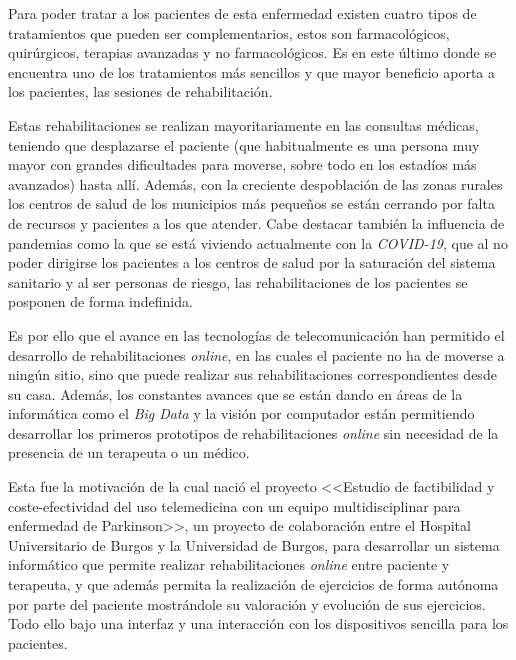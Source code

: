 Para poder tratar a los pacientes de esta enfermedad existen cuatro tipos de tratamientos que pueden ser complementarios, estos son farmacológicos, quirúrgicos, terapias avanzadas y no farmacológicos. Es en este último donde se encuentra uno de los tratamientos más sencillos y que mayor beneficio aporta a los pacientes, las sesiones de rehabilitación.

Estas rehabilitaciones se realizan mayoritariamente en las consultas médicas, teniendo que desplazarse el paciente (que habitualmente es una persona muy mayor con grandes dificultades para moverse, sobre todo en los estadíos más avanzados) hasta allí. Además, con la creciente despoblación de las zonas rurales los centros de salud de los municipios más pequeños se están cerrando por falta de recursos y pacientes a los que atender. Cabe destacar también la influencia de pandemias como la que se está viviendo actualmente con la \textit{COVID-19}, que al no poder dirigirse los pacientes a los centros de salud por la saturación del sistema sanitario y al ser personas de riesgo, las rehabilitaciones de los pacientes se posponen de forma indefinida.

Es por ello que el avance en las tecnologías de telecomunicación han permitido el desarrollo de rehabilitaciones \textit{online}, en las cuales el paciente no ha de moverse a ningún sitio, sino que puede realizar sus rehabilitaciones correspondientes desde su casa. Además, los constantes avances que se están dando en áreas de la informática como el \textit{Big Data} y la visión por computador están permitiendo desarrollar los primeros prototipos de rehabilitaciones \textit{online} sin necesidad de la presencia de un terapeuta o un médico.

Esta fue la motivación de la cual nació el proyecto <<Estudio de factibilidad y coste-efectividad del uso telemedicina con un equipo multidisciplinar para enfermedad de Parkinson>>, un proyecto de colaboración entre el Hospital Universitario de Burgos y la Universidad de Burgos, para desarrollar un sistema informático que permite realizar rehabilitaciones \textit{online} entre paciente y terapeuta, y que además permita la realización de ejercicios de forma autónoma por parte del paciente mostrándole su valoración y evolución de sus ejercicios. Todo ello bajo una interfaz y una interacción con los dispositivos sencilla para los pacientes.

